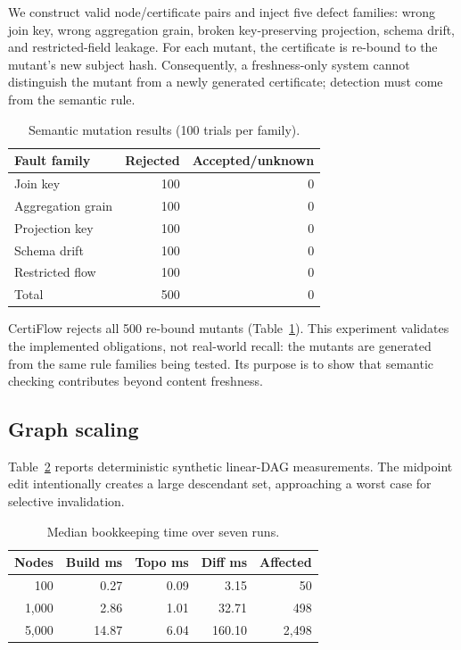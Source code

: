 We construct valid node/certificate pairs and inject five defect families: wrong join key, wrong aggregation grain, broken key-preserving projection, schema drift, and restricted-field leakage. For each mutant, the certificate is re-bound to the mutant's new subject hash. Consequently, a freshness-only system cannot distinguish the mutant from a newly generated certificate; detection must come from the semantic rule.

\begin{table}[t]
\caption{Semantic mutation results (100 trials per family).}
\label{tab:mutation}
\small
\begin{tabular}{lrr}
\toprule
Fault family & Rejected & Accepted/unknown \\
\midrule
Join key & 100 & 0 \\
Aggregation grain & 100 & 0 \\
Projection key & 100 & 0 \\
Schema drift & 100 & 0 \\
Restricted flow & 100 & 0 \\
\midrule
Total & 500 & 0 \\
\bottomrule
\end{tabular}
\end{table}

CertiFlow rejects all 500 re-bound mutants (Table~\ref{tab:mutation}). This experiment validates the implemented obligations, not real-world recall: the mutants are generated from the same rule families being tested. Its purpose is to show that semantic checking contributes beyond content freshness.

\subsection{Graph scaling}

Table~\ref{tab:scaling} reports deterministic synthetic linear-DAG measurements. The midpoint edit intentionally creates a large descendant set, approaching a worst case for selective invalidation.

\begin{table}[t]
\caption{Median bookkeeping time over seven runs.}
\label{tab:scaling}
\small
\begin{tabular}{rrrrr}
\toprule
Nodes & Build ms & Topo ms & Diff ms & Affected \\
\midrule
100 & 0.27 & 0.09 & 3.15 & 50 \\
1,000 & 2.86 & 1.01 & 32.71 & 498 \\
5,000 & 14.87 & 6.04 & 160.10 & 2,498 \\
\bottomrule
\end{tabular}
\end{table}


